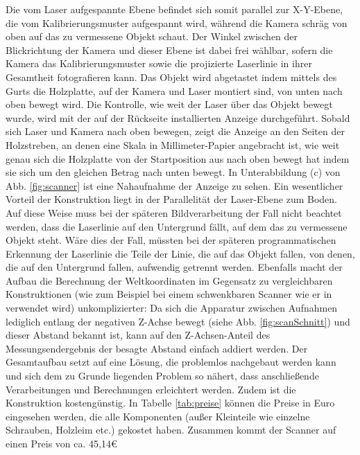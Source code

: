 \bigbreak
Die vom Laser aufgespannte Ebene befindet sich somit parallel zur X-Y-Ebene, die vom Kalibrierungsmuster aufgespannt wird, während die Kamera schräg von oben auf das zu vermessene Objekt schaut. Der Winkel zwischen der Blickrichtung der Kamera und dieser Ebene ist dabei frei wählbar, sofern die Kamera das Kalibrierungsmuster sowie die projizierte Laserlinie in ihrer Gesamtheit fotografieren kann.  Das Objekt wird abgetastet indem mittels des Gurts die Holzplatte, auf der Kamera und Laser montiert sind, von unten nach oben bewegt wird. Die Kontrolle, wie weit der Laser über das Objekt bewegt wurde, wird mit der auf der Rückseite installierten Anzeige durchgeführt. Sobald sich Laser und Kamera nach oben bewegen, zeigt die Anzeige an den Seiten der Holzstreben, an denen eine Skala in Millimeter-Papier angebracht ist, wie weit genau sich die Holzplatte von der Startposition aus nach oben bewegt hat indem sie sich um den gleichen Betrag nach unten bewegt. In Unterabbildung (c) von Abb. \ref{fig:scanner} ist eine Nahaufnahme der Anzeige zu sehen. \newline
Ein wesentlicher Vorteil der Konstruktion liegt in der Parallelität der Laser-Ebene zum Boden. Auf diese Weise muss bei der späteren Bildverarbeitung der Fall nicht beachtet werden, dass die Laserlinie auf den Untergrund fällt, auf dem das zu vermessene Objekt steht. Wäre dies der Fall, müssten bei der späteren programmatischen Erkennung der Laserlinie die Teile der Linie, die auf das Objekt fallen, von denen, die auf den Untergrund fallen, aufwendig getrennt werden. Ebenfalls macht der Aufbau die Berechnung der Weltkoordinaten im Gegensatz zu vergleichbaren Konstruktionen (wie zum Beispiel bei einem schwenkbaren Scanner wie er in \cite{Azad:07} verwendet wird) unkomplizierter: Da sich die Apparatur zwischen Aufnahmen lediglich entlang der negativen Z-Achse bewegt (siehe Abb. \ref{fig:scanSchnitt}) und dieser Abstand bekannt ist, kann auf den Z-Achsen-Anteil des Messungsendergebnis der besagte Abstand einfach addiert werden.\newline
Der Gesamtaufbau setzt auf eine Lösung, die problemlos nachgebaut werden kann und sich dem zu Grunde liegenden Problem so nähert, dass anschließende Verarbeitungen und Berechnungen erleichtert werden. Zudem ist die Konstruktion kostengünstig. In Tabelle \ref{tab:preise} können die Preise in Euro eingesehen werden, die alle Komponenten (außer Kleinteile wie einzelne Schrauben, Holzleim etc.) gekostet haben. Zusammen kommt der Scanner auf einen Preis von ca. 45,14\euro

